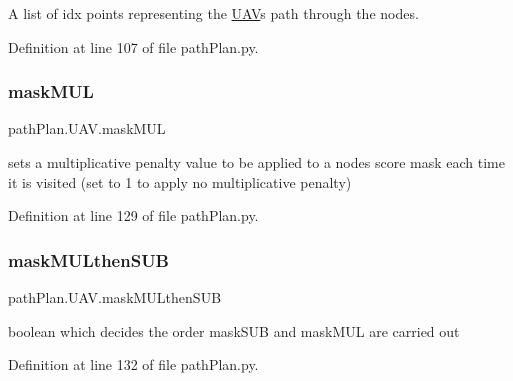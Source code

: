 A list of idx points representing the \mbox{\hyperlink{classpath_plan_1_1_u_a_v}{U\+AV}}\textquotesingle{}s path through the nodes. 



Definition at line 107 of file path\+Plan.\+py.

\mbox{\label{classpath_plan_1_1_u_a_v_ad5c1ef816da92a394a4e6bc1f0ebac62}} 
\subsubsection{\texorpdfstring{mask\+M\+UL}{maskMUL}}
{\footnotesize\ttfamily path\+Plan.\+U\+A\+V.\+mask\+M\+UL}



sets a multiplicative penalty value to be applied to a node\textquotesingle{}s score mask each time it is visited (set to 1 to apply no multiplicative penalty) 



Definition at line 129 of file path\+Plan.\+py.

\mbox{\label{classpath_plan_1_1_u_a_v_aba8b84c7dde1938e44f23dbf9955b207}} 
\subsubsection{\texorpdfstring{mask\+M\+U\+Lthen\+S\+UB}{maskMULthenSUB}}
{\footnotesize\ttfamily path\+Plan.\+U\+A\+V.\+mask\+M\+U\+Lthen\+S\+UB}



boolean which decides the order mask\+S\+UB and mask\+M\+UL are carried out 



Definition at line 132 of file path\+Plan.\+py.

\mbox{\label{classpath_plan_1_1_u_a_v_a74225919230caef7abcd27e5dfcb1f7e}} 
